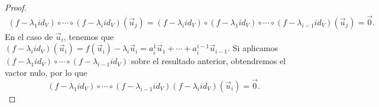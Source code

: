 \begin{proof}
\[\begin{split}
\left(f - \lambda_{1}id _{V}\right)\circ \cdots\circ \left(f - \lambda_{i}id _{V}\right)\left(\vec{u}_{j}\right) = \left(f - \lambda_{i}id _{V}\right)\circ\left(f - \lambda_{1}id _{V}\right)\circ \cdots\circ \left(f - \lambda_{i-1}id _{V}\right)\left(\vec{u}_{j}\right) = \vec{0}.
\end{split}
\]
En el caso de $\displaystyle \vec{u}_{i} $, tenemos que $\displaystyle \left(f - \lambda_{i}id _{V}\right)\left(\vec{u}_{i}\right) = f\left(\vec{u}_{i}\right)-\lambda_{i}\vec{u}_{i} =  a^{1}_{i}\vec{u}_{1} + \cdots + a^{i -1}_{i}\vec{u}_{i-1} $. Si aplicamos $\displaystyle \left(f - \lambda_{1}id _{V}\right) \circ \cdots \circ \left(f - \lambda_{i - 1}id _{V}\right) $ sobre el resultado anterior, obtendremos el vactor nulo, por lo que
\[ \left(f - \lambda_{1}id _{V}\right) \circ \cdots \circ \left(f - \lambda_{i - 1}id _{V}\right)\left(f - \lambda_{i}id _{V}\right)\left(\vec{u}_{i}\right) = \vec{0} .\]
\end{proof}
